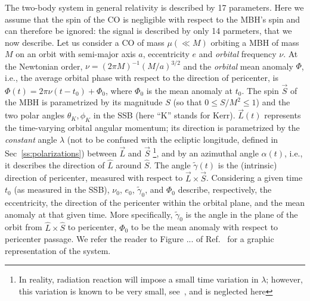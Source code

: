 \documentclass[12pt]{iopart}
\begin{document}
The two-body system in general relativity is described by 17 parameters. Here we assume that the spin of the CO is negligible with respect to the MBH's spin and can therefore be ignored: the signal is described by only 14 parmeters, that we now describe. Let us consider a CO of mass $\mu (\ll M)$ orbiting a MBH of mass $M$ on an orbit with semi-major axis $a$, eccentricity $e$ and \emph{orbital} frequency $\nu$. At the Newtonian order,  $\nu = (2\pi M)^{-1} (M/a)^{3/2}$ and the \emph{orbital} mean anomaly $\Phi$, i.e., the average orbital phase with respect to the direction of pericenter, is $\Phi(t) = 2\pi\nu (t-t_0) +\Phi_0$, where  $\Phi_0$ is the mean anomaly at $t_0$. The spin $\vec S$ of the MBH is parametrized by its magnitude $S$ (so that $0 \le S/M^2 \le 1$) and the two polar angles $\theta_K,\phi_K$ in the SSB (here ``K'' stands for Kerr). $\vec L(t)$ represents the time-varying orbital angular momentum; its direction is parametrized by the \emph{constant} angle $\lambda$ (not to be confused with the ecliptic longitude, defined in Sec~\ref{ss:polarizations}) between $\vec L$ and $\vec S$%
\footnote{In reality, radiation reaction will impose a small time variation in $\lambda$; however, this variation is known to be very small, see~\cite{scott1}, and is neglected here},%
and by an azimuthal angle $\alpha(t)$, i.e., it describes the direction of $\hat L$ around $\hat S$. The angle $\tilde\gamma(t)$ is the (intrinsic) direction of pericenter, measured with respect to $\vec L\times\vec S$. Considering a given time $t_0$ (as measured in the SSB), $\nu_0$, $e_0$, $\tilde\gamma_0$, and $\Phi_0$ describe, respectively, the eccentricity, the direction of the pericenter within the orbital plane, and the mean anomaly at that given time. More specifically, $\tilde\gamma_0$ is the angle in the plane of the orbit from $\hat L \times \hat S$ to pericenter, $\Phi_0$ to be the mean anomaly with respect to pericenter passage. We refer the reader to Figure ... of Ref.~\cite{BC} for a graphic representation of the system.
\end{document}
